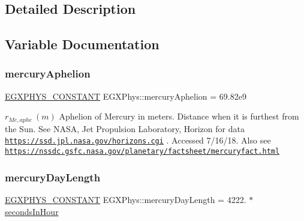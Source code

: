 \subsection{Detailed Description}


\subsection{Variable Documentation}
\mbox{\label{group___e_g_x_phys-_constants-_astrophysics-_solar_system-_mercury-_orbit_gaffbe46a6fa3661973f7bb52ec3f55200}} 
\subsubsection{\texorpdfstring{mercury\+Aphelion}{mercuryAphelion}}
{\footnotesize\ttfamily \mbox{\hyperlink{group___e_g_x_phys-_constants-_macros_ga76980d288494ce1714c9ac68a95ba702}{E\+G\+X\+P\+H\+Y\+S\+\_\+\+C\+O\+N\+S\+T\+A\+NT}} E\+G\+X\+Phys\+::mercury\+Aphelion = 69.\+82e9}

$ r_{Me,aphe} \ (m)$ Aphelion of Mercury in meters. Distance when it is furthest from the Sun. See N\+A\+SA, Jet Propulsion Laboratory, Horizon for data \href{https://ssd.jpl.nasa.gov/horizons.cgi}{\tt https\+://ssd.\+jpl.\+nasa.\+gov/horizons.\+cgi} . Accessed 7/16/18. Also see \href{https://nssdc.gsfc.nasa.gov/planetary/factsheet/mercuryfact.html}{\tt https\+://nssdc.\+gsfc.\+nasa.\+gov/planetary/factsheet/mercuryfact.\+html} \mbox{\label{group___e_g_x_phys-_constants-_astrophysics-_solar_system-_mercury-_orbit_ga76e5523953ddab271845bbaf597fc16c}} 
\subsubsection{\texorpdfstring{mercury\+Day\+Length}{mercuryDayLength}}
{\footnotesize\ttfamily \mbox{\hyperlink{group___e_g_x_phys-_constants-_macros_ga76980d288494ce1714c9ac68a95ba702}{E\+G\+X\+P\+H\+Y\+S\+\_\+\+C\+O\+N\+S\+T\+A\+NT}} E\+G\+X\+Phys\+::mercury\+Day\+Length = 4222. $\ast$ \mbox{\hyperlink{namespace_e_g_x_phys_a7c3165cd93e36f1fb8e9fef80f117bef}{seconds\+In\+Hour}}}

